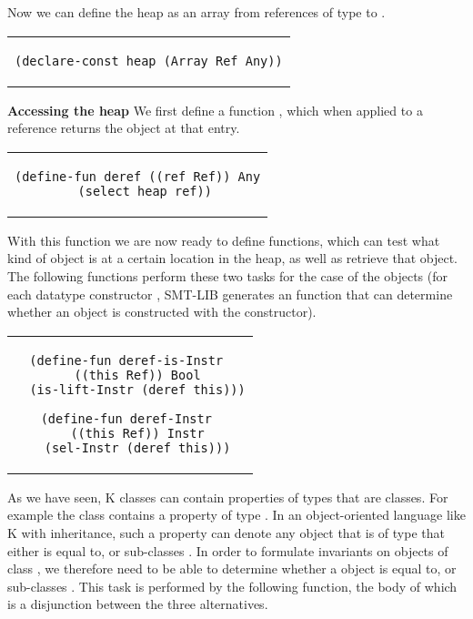 \noindent Now we can define the heap as an array from references of
type  to .

\begin{center}
\begin{tabular}{c}
\small
\begin{lstlisting}
(declare-const heap (Array Ref Any))
\end{lstlisting}
\end{tabular}
\end{center}

\textbf{Accessing the heap} We first define a function ,
which when applied to a reference returns the  object at
that entry.

\begin{center}
\begin{tabular}{c}
\small
\begin{lstlisting}
(define-fun deref ((ref Ref)) Any
  (select heap ref))
\end{lstlisting}
\end{tabular}
\end{center}

\noindent With this function we are now ready to define functions,
which can test what kind of object is at a certain location in the
heap, as well as retrieve that object. The following functions perform
these two tasks for the case of the  objects (for
each datatype constructor , SMT-LIB generates an 
function that can determine whether an object is constructed with the
constructor).

\begin{center}
\begin{tabular}{c}
\small
\begin{lstlisting}
(define-fun deref-is-Instr 
  ((this Ref)) Bool
  (is-lift-Instr (deref this)))

(define-fun deref-Instr 
  ((this Ref)) Instr
  (sel-Instr (deref this)))
\end{lstlisting}
\end{tabular}
\end{center}

\noindent As we have seen, K classes can contain properties of types
that are classes. For example the  class contains a
property  of type . In an object-oriented
language like K with inheritance, such a property can denote any
object that is of type that either is equal to, or sub-classes
. In order to formulate invariants on objects of
class , we therefore need to be able to determine
whether a  object is equal to, or sub-classes
. This task is performed by the following function,
the body of which is a disjunction between the three alternatives.


